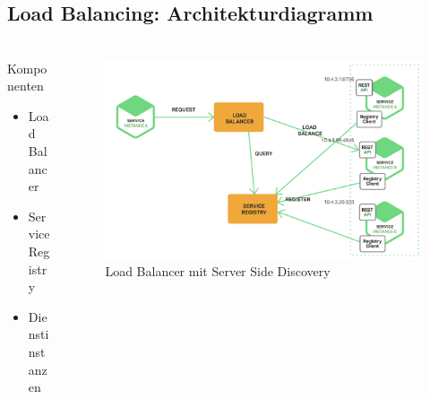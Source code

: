 \subsection{Load Balancing: Architekturdiagramm}
\begin{frame}
    \frametitle{\insertsection}
    \framesubtitle{\insertsubsection}
    \begin{columns}[c]
        \begin{column}{0.4\textwidth}
	        \begin{block}{Komponenten}
	            \begin{itemize}
	                \item Load Balancer
	                \item Service Registry
	                \item Dienstinstanzen
	            \end{itemize}
	        \end{block}
        \end{column}
        \begin{column}{0.6\textwidth}
        	\begin{figure}[h]
	            \centering
	            \captionsetup{aboveskip=0pt}
	            \includegraphics[width=.95\linewidth]{../images/loadbalancer}  
	            \caption{Load Balancer mit Server Side Discovery}      		
        	\end{figure}
        \end{column}
    \end{columns}


    
\end{frame}

